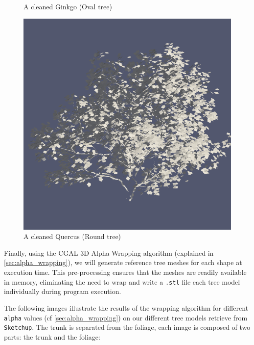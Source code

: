 \documentclass[12pt]{article}
\begin{document}
\begin{figure}[H]
\begin{minipage}{0.30\textwidth}
        \caption{A cleaned Ginkgo (Oval tree)}
    \end{minipage}
    \begin{minipage}{0.30\textwidth}
        \centering
        \includegraphics[width=1\textwidth]{images/tree-quercus.png}
        \caption{A cleaned Quercus (Round tree)}
    \end{minipage}
\end{figure}

Finally, using the CGAL 3D Alpha Wrapping algorithm (explained in \autoref{sec:alpha_wrapping}), 
we will generate reference tree
meshes for each shape at execution time. This pre-processing ensures
that the meshes are readily available in memory, eliminating the need to wrap and
write a \texttt{.stl} file each tree model individually during program execution.


The following images illustrate the results of the wrapping algorithm for different
\texttt{alpha} values (cf \autoref{sec:alpha_wrapping}) on our different tree models
 retrieve from \texttt{Sketchup}. The trunk is separated from the foliage, each image is composed of two parts: 
the trunk and the foliage:
\end{document}

